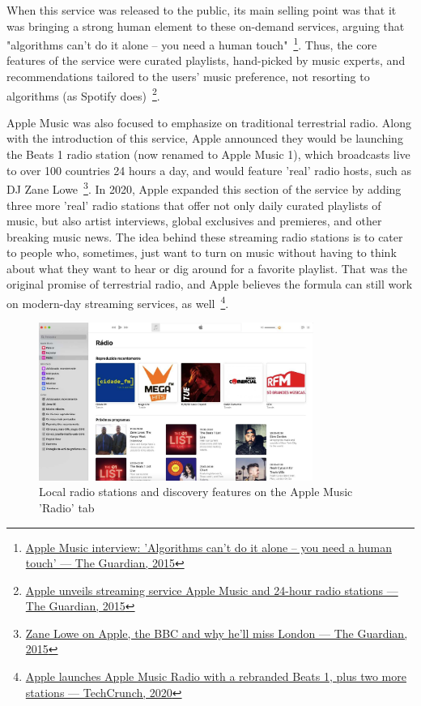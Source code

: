When this service was released to the public, its main selling point was that it was bringing a strong human element to these on-demand services, arguing that "algorithms can't do it alone – you need a human touch"~\footnote{\href{https://www.theguardian.com/technology/2015/jun/09/apple-music-interview-jimmy-iovine-eddy-cue}{Apple Music interview: 'Algorithms can't do it alone – you need a human touch' — The Guardian, 2015}}. Thus, the core features of the service were curated playlists, hand-picked by music experts, and recommendations tailored to the users' music preference, not resorting to algorithms (as Spotify does)~\footnote{\href{https://www.theguardian.com/technology/2015/jun/08/apple-music-streaming-service-wwdc-spotify}{Apple unveils streaming service Apple Music and 24-hour radio stations — The Guardian, 2015}}.

Apple Music was also focused to emphasize on traditional terrestrial radio. Along with the introduction of this service, Apple announced they would be launching the Beats 1 radio station (now renamed to Apple Music 1), which broadcasts live to over 100 countries 24 hours a day, and would feature 'real' radio hosts, such as DJ Zane Lowe~\footnote{\href{https://www.theguardian.com/music/2015/feb/16/zane-lowe-apple-bbc-london-radio1-la}{Zane Lowe on Apple, the BBC and why he’ll miss London — The Guardian, 2015}}. In 2020, Apple expanded this section of the service by adding three more 'real' radio stations that offer not only daily curated playlists of music, but also artist interviews, global exclusives and premieres, and other breaking music news. The idea behind these streaming radio stations is to cater to people who, sometimes, just want to turn on music without having to think about what they want to hear or dig around for a favorite playlist. That was the original promise of terrestrial radio, and Apple believes the formula can still work on modern-day streaming services, as well~\footnote{\href{https://www.theguardian.com/music/2015/feb/16/zane-lowe-apple-bbc-london-radio1-la}{Apple launches Apple Music Radio with a rebranded Beats 1, plus two more stations — TechCrunch, 2020}}.

\begin{figure}[h]
\centering
\includegraphics[width=0.8\textwidth]{./Images/applemusic.png}
\caption{Local radio stations and discovery features on the Apple Music 'Radio' tab}
\label{fig:test_env}
\end{figure}

